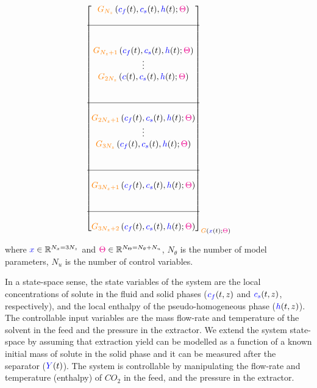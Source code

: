 \documentclass[../Article_Model_Parameters.tex]{subfiles}
\begin{document}
{\begin{align*}
{\begin{bmatrix}
							{\color{orange}G_{N_z}} \left( {\color{blue}c_f}(t),{\color{blue}c_s}(t),{\color{blue}h}(t); {\color{magenta}\Theta} \right)\\ 
							\\ \hline \\ \\
							{\color{orange}G_{N_z+1}} \left( {\color{blue}c_f}(t),{\color{blue}c_s}(t),{\color{blue}h}(t); {\color{magenta}\Theta} \right)\\ 
							\vdots\\
							{\color{orange}G_{2N_z}} \left( {\color{blue}c}(t),{\color{blue}c_s}(t),{\color{blue}h}(t); {\color{magenta}\Theta} \right)\\ 
							\\ \\ \hline \\ 
							{\color{orange}G_{2N_z+1}} \left( {\color{blue}c_f}(t),{\color{blue}c_s}(t),{\color{blue}h}(t); {\color{magenta}\Theta} \right) \\
							\vdots\\
							{\color{orange}G_{3N_z}} \left( {\color{blue}c_f}(t),{\color{blue}c_s}(t),{\color{blue}h}(t); {\color{magenta}\Theta} \right) \\ 
							\\ \\ \hline \\
							{\color{orange}G_{3N_z+1}} \left( {\color{blue}c_f}(t),{\color{blue}c_s}(t),{\color{blue}h}(t); {\color{magenta}\Theta} \right) \\
							\\ \\ \hline \\
							{\color{orange}G_{3N_z+2}} \left( {\color{blue}c_f}(t),{\color{blue}c_s}(t),{\color{blue}h}(t); {\color{magenta}\Theta} \right) 
					\end{bmatrix}}_{{\color{orange}G} \left( {\color{blue}x}(t); {\color{magenta}\Theta} \right)} 
			\end{align*} }
			
			where ${\color{blue}x} \in \mathbb{R}^{N_x = 3N_z} $ and ${\color{magenta}\Theta} \in \mathbb{R}^{N_\Theta =  N_{\theta} + N_u } $, $N_{\theta}$ is the number of model parameters, $N_{u}$ is the number of control variables.
			
			In a state-space sense, the state variables of the system are the local concentrations of solute in the fluid and solid phases (${\color{blue}c_f}(t,z)$ and ${\color{blue}c_s}(t,z)$, respectively), and the local enthalpy of the pseudo-homogeneous phase (${\color{blue}h}(t,z)$). The controllable input variables are the mass flow-rate and temperature of the solvent in the feed and the pressure in the extractor. We extend the system state-space by assuming that extraction yield can be modelled as a function of a known initial mass of solute in the solid phase and it can be measured after the separator (${\color{blue}Y}(t)$). The system is controllable by manipulating the flow-rate and temperature (enthalpy) of $CO_2$ in the feed, and the pressure in the extractor.
			
\end{document}
